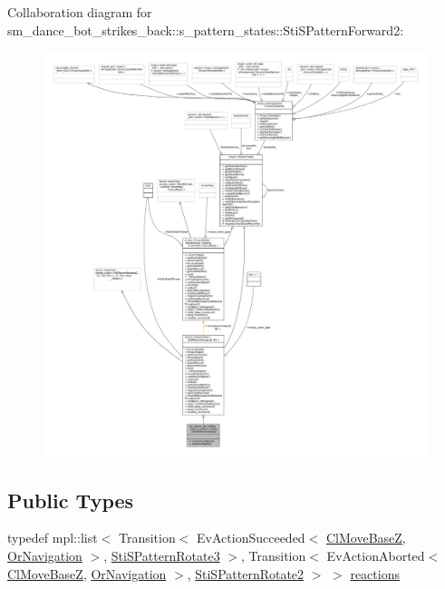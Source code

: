 Collaboration diagram for sm\+\_\+dance\+\_\+bot\+\_\+strikes\+\_\+back\+:\+:s\+\_\+pattern\+\_\+states\+:\+:Sti\+S\+Pattern\+Forward2\+:
\nopagebreak
\begin{figure}[H]
\begin{center}
\leavevmode
\includegraphics[width=350pt]{structsm__dance__bot__strikes__back_1_1s__pattern__states_1_1StiSPatternForward2__coll__graph}
\end{center}
\end{figure}
\subsection*{Public Types}
\begin{DoxyCompactItemize}
\item 
typedef mpl\+::list$<$ Transition$<$ Ev\+Action\+Succeeded$<$ \hyperlink{classcl__move__base__z_1_1ClMoveBaseZ}{Cl\+Move\+BaseZ}, \hyperlink{classsm__dance__bot__strikes__back_1_1OrNavigation}{Or\+Navigation} $>$, \hyperlink{structsm__dance__bot__strikes__back_1_1s__pattern__states_1_1StiSPatternRotate3}{Sti\+S\+Pattern\+Rotate3} $>$, Transition$<$ Ev\+Action\+Aborted$<$ \hyperlink{classcl__move__base__z_1_1ClMoveBaseZ}{Cl\+Move\+BaseZ}, \hyperlink{classsm__dance__bot__strikes__back_1_1OrNavigation}{Or\+Navigation} $>$, \hyperlink{structsm__dance__bot__strikes__back_1_1s__pattern__states_1_1StiSPatternRotate2}{Sti\+S\+Pattern\+Rotate2} $>$ $>$ \hyperlink{structsm__dance__bot__strikes__back_1_1s__pattern__states_1_1StiSPatternForward2_ab3483ca233c3db968c87b73e1f733168}{reactions}
\end{DoxyCompactItemize}
